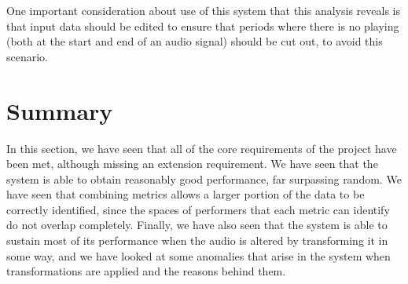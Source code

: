 \documentclass[oneside, class=book, 12pt, crop=false]{standalone}
\begin{document}
One important consideration about use of this system that this analysis reveals is that input data should be edited to ensure that periods where there is no playing (both at the start and end of an audio signal) should be cut out, to avoid this scenario. 


\section{Summary}

In this section, we have seen that all of the core requirements of the project have been met, although missing an extension requirement. We have seen that the system is able to obtain reasonably good performance, far surpassing random. We have seen that combining metrics allows a larger portion of the data to be correctly identified, since the spaces of performers that each metric can identify do not overlap completely. Finally, we have also seen that the system is able to sustain most of its performance when the audio is altered by transforming it in some way, and we have looked at some anomalies that arise in the system when transformations are applied and the reasons behind them.












\ifstandalone
  \printbibliography
\fi
    
\end{document}
